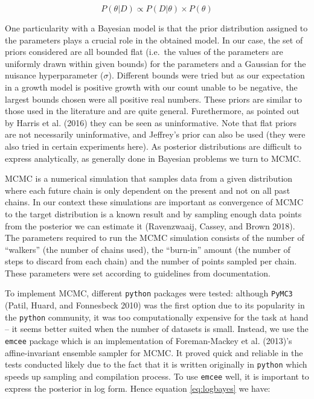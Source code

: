 \documentclass[12pt,]{article}
\begin{document}
\begin{equation}
P(\theta|D) \propto P(D|\theta) \times P(\theta) \label{eq:bayes}
\end{equation}

One particularity with a Bayesian model is that the prior distribution assigned to the parameters plays a crucial role in the obtained model. In our case, the set of priors considered are all bounded flat (i.e.~the values of the parameters are uniformly drawn within given bounds) for the parameters and a Gaussian for the nuisance hyperparameter (\(\sigma\)). Different bounds were tried but as our expectation in a growth model is positive growth with our count unable to be negative, the largest bounds chosen were all positive real numbers. These priors are similar to those used in the literature and are quite general. Furethermore, as pointed out by Harris et al. (2016) they can be seen as uninformative. Note that flat priors are not necessarily uninformative, and Jeffrey's prior can also be used (they were also tried in certain experiments here). As posterior distributions are difficult to express analytically, as generally done in Bayesian problems we turn to MCMC.

MCMC is a numerical simulation that samples data from a given distribution where each future chain is only dependent on the present and not on all past chains. In our context these simulations are important as convergence of MCMC to the target distribution is a known result and by sampling enough data points from the posterior we can estimate it (Ravenzwaaij, Cassey, and Brown 2018). The parameters required to run the MCMC simulation consists of the number of ``walkers'' (the number of chains used), the ``burn-in'' amount (the number of steps to discard from each chain) and the number of points sampled per chain. These parameters were set according to guidelines from documentation.

To implement MCMC, different \texttt{python} packages were tested: although \texttt{PyMC3} (Patil, Huard, and Fonnesbeck 2010) was the first option due to its popularity in the \texttt{python} community, it was too computationally expensive for the task at hand -- it seems better suited when the number of datasets is small. Instead, we use the \texttt{emcee} package which is an implementation of Foreman-Mackey et al. (2013)'s affine-invariant ensemble sampler for MCMC. It proved quick and reliable in the tests conducted likely due to the fact that it is written originally in \texttt{python} which speeds up sampling and compilation process. To use \texttt{emcee} well, it is important to express the posterior in log form. Hence equation \eqref{eq:logbayes} we have:
\end{document}
